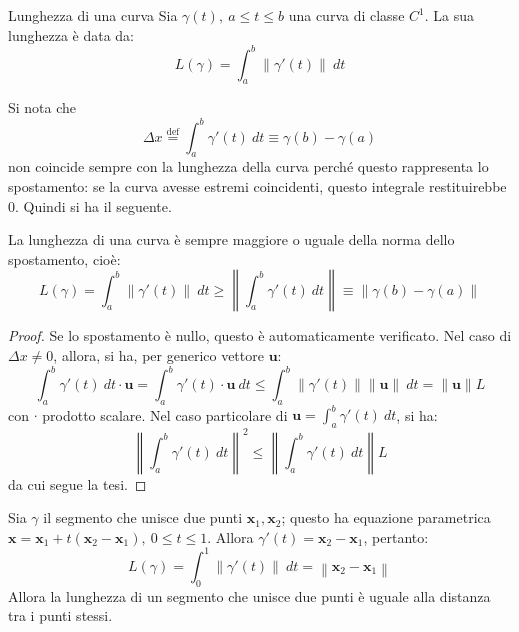 \documentclass[10pt, a4paper]{scrartcl}
\theoremstyle{definition}
\numberwithin{esempio}{section}
\theoremstyle{definition}
\numberwithin{obs}{section}
\numberwithin{nota}{section}
\numberwithin{equation}{subsection}
\begin{document}
\begin{definizione}
	{Lunghezza di una curva}{}
	Sia $\gamma(t), \ a\le t \le b$ una curva di classe $C^1$. La sua lunghezza \`e data da:
	\[
	L(\gamma) = \int_{a} ^b \left\lVert \gamma'(t) \right\rVert  \ dt
	\] 
\end{definizione}
	Si nota che 
	\[
	\Delta x \overset{\text{def}}{=} \int_{a} ^b \gamma'(t) \ dt \equiv \gamma(b) - \gamma(a)
	\] 
	non coincide sempre con la lunghezza della curva perch\'e questo rappresenta lo spostamento: se la curva avesse estremi coincidenti, questo integrale restituirebbe $0$. Quindi si ha il seguente.
	\begin{teorema}
		{}{}
La lunghezza di una curva \`e sempre maggiore o uguale della norma dello spostamento, cio\`e:
\[
L(\gamma) = \int_{a} ^b \left\lVert \gamma'(t) \right\rVert \ dt \ge \left\lVert \int_{a} ^b \gamma'(t) \ dt \right\rVert  \equiv \left\lVert \gamma(b) - \gamma(a) \right\rVert 
\] 
\begin{proof}
	Se lo spostamento \`e nullo, questo \`e automaticamente verificato. 
	Nel caso di $\Delta x \neq 0  $, allora, si ha, per generico vettore $\mathbf{u} $:
	\[
	\int_{a} ^b \gamma'(t) \ dt \cdot  \mathbf{u} = \int_{a} ^b \gamma'(t)\cdot  \mathbf{u} \ dt \le \int_{a } ^b \left\lVert \gamma'(t) \right\rVert \left\lVert \mathbf{u}  \right\rVert \ dt = \left\lVert \mathbf{u}  \right\rVert  L
	\] 
	con $\cdot $ prodotto scalare.
	Nel caso particolare di $\mathbf{u}  = \int_{a}^b \gamma'(t) \ dt $, si ha:
	\[
	\left\lVert \int_{a} ^b \gamma'(t) \ dt  \right\rVert ^2 \le \left\lVert \int_{a} ^b \gamma'(t) \ dt \right\rVert  L 
	\] 
da cui segue la tesi.	
\end{proof}
	\end{teorema}
Sia $\gamma$ il segmento che unisce due punti $\mathbf{x}_1 , \mathbf{x} _2$; questo ha equazione parametrica $\mathbf{x}  = \mathbf{x} _1 + t (\mathbf{x} _2 - \mathbf{x} _1) , \ 0\le  t \le 1$. Allora $\gamma'(t) = \mathbf{x} _2 - \mathbf{x} _1$, pertanto:
\[
L(\gamma) = \int_{0} ^1 \left\lVert \gamma'(t) \right\rVert \ dt = \left\lVert \mathbf{x}_2 - \mathbf{x} _1  \right\rVert 
\] 
Allora la lunghezza di un segmento che unisce due punti \`e uguale alla distanza tra i punti stessi.
\end{document}
